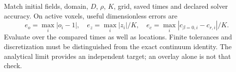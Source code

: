 Match initial fields, domain, $D$, $\rho$, $K$, grid, saved times and declared solver accuracy. On active voxels, useful dimensionless errors are
\[
e_o=\max_i|o_i-1|,\quad e_z=\max_i|z_i|/K,\quad
e_c=\max_i|c_{\beta=0,i}-c_{r,i}|/K.
\]
Evaluate over the compared times as well as locations. Finite tolerances and discretization must be distinguished from the exact continuum identity. The analytical limit provides an independent target; an overlay alone is not that check.
